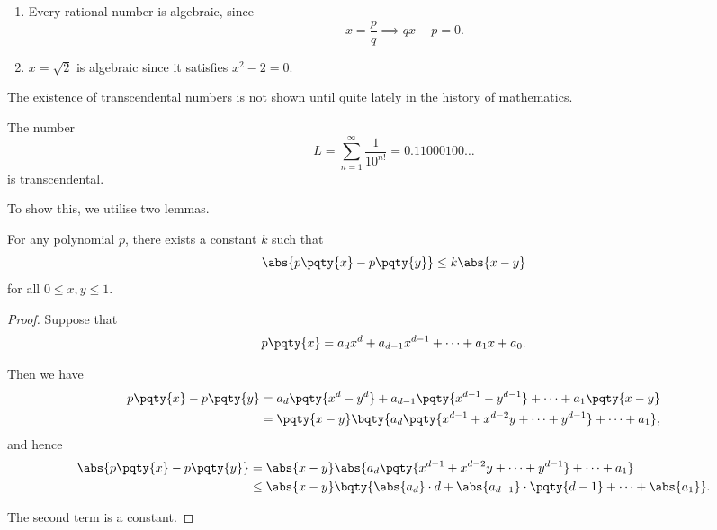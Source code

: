 \begin{examples}
    \begin{enumerate}
        \item Every rational number is algebraic, since
        \[
            x = \frac{p}{q} \implies qx - p = 0.
        \]

        \item \(x = \sqrt{2}\) is algebraic since it satisfies \(x^2 - 2 = 0\).
    \end{enumerate}
\end{examples}

The existence of transcendental numbers is not shown until quite lately in the history of mathematics.

\begin{theorem}
    The number
    \[
        L = \sum_{n = 1}^{\infty} \frac{1}{10^{n!}} = 0.11000100\ldots
    \]
    is transcendental.
\end{theorem}

To show this, we utilise two lemmas.

\begin{lemma}
    For any polynomial \(p\), there exists a constant \(k\) such that
    \[
        \abs{p\pqty{x} - p\pqty{y}} \leq k \abs{x - y}
    \]
    for all \(0 \leq x, y \leq 1\).
\end{lemma}

\begin{proof}
    Suppose that
    \[
        p\pqty{x} = a_d x^d + a_{d - 1} x^{d - 1} + \cdots + a_1 x + a_0.
    \]

    Then we have
    \begin{align*}
        p\pqty{x} - p\pqty{y} &= a_d \pqty{x^d - y^d} + a_{d - 1} \pqty{x^{d - 1} - y^{d - 1}} + \cdots + a_1 \pqty{x - y} \\
        &= \pqty{x - y} \bqty{a_d \pqty{x^{d - 1} + x^{d - 2} y + \cdots + y^{d - 1}} + \cdots + a_1},
    \end{align*}
    and hence
    \begin{align*}
        \abs{p \pqty{x} - p \pqty{y}} &= \abs{x - y} \abs{a_d \pqty{x^{d - 1} + x^{d - 2} y + \cdots + y^{d - 1}} + \cdots + a_1} \\
        &\leq \abs{x - y} \bqty{\abs{a_d} \cdot d + \abs{a_{d - 1}} \cdot \pqty{d - 1} + \cdots + \abs{a_1}}.
    \end{align*}

    The second term is a constant.
\end{proof}

